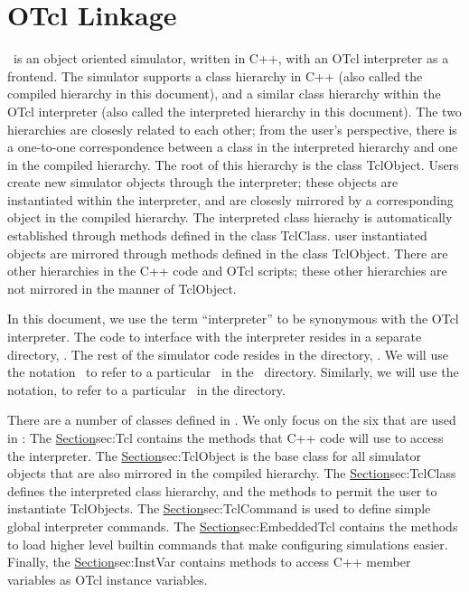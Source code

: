 \chapter{OTcl Linkage}
\label{chap:otcl:intro}

\ns\ is an object oriented simulator,
written in C++, with an OTcl interpreter as a frontend.
The simulator supports a class hierarchy in C++
(also called the compiled hierarchy in this document),
and a similar class hierarchy within the OTcl interpreter
(also called the interpreted hierarchy in this document).
The two hierarchies are closesly related to each other;
from the user's perspective,
there is a one-to-one correspondence
between a class in the interpreted hierarchy
and one in the compiled hierarchy.
The root of this hierarchy is the class TclObject.
Users create new simulator objects through the interpreter;
these objects are instantiated within the interpreter, 
and are closesly mirrored by a corresponding object
in the compiled hierarchy.
The interpreted class hierachy is automatically established through
methods defined in the class TclClass.
user instantiated objects are mirrored through methods
defined in the class TclObject.
There are other hierarchies in the C++ code and OTcl scripts;
these other hierarchies are not mirrored in the manner of TclObject.

In this document,
we use the term ``interpreter''
to be synonymous with the OTcl interpreter.
The code to interface with the interpreter resides
in a separate directory, .
The rest of the simulator code resides in the directory, .
We will use the notation \
to refer to a particular \ in the
\ directory.
Similarly, we will use the notation, 
to refer to a particular \tup{file}\ in the  directory.

There are a number of classes defined in \Tclf{}.
We only focus on the six that are used in \ns:
The \href{Class Tcl}{Section}{sec:Tcl} contains the methods that
C++ code will use to access the interpreter.
The \href{class TclObject}{Section}{sec:TclObject}
is the base class for all simulator objects that are also mirrored 
in the compiled hierarchy.
The \href{class TclClass}{Section}{sec:TclClass} defines
the interpreted class hierarchy, and 
the methods to permit the user to instantiate TclObjects.
The \href{class TclCommand}{Section}{sec:TclCommand}
is used to define simple global interpreter commands.
The \href{class EmbeddedTcl}{Section}{sec:EmbeddedTcl}
contains the methods to load higher level builtin commands
that make configuring simulations easier.
Finally, the \href{class InstVar}{Section}{sec:InstVar}
contains methods to access C++ member variables
as OTcl instance variables.


